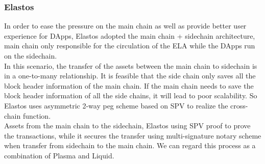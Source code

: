 \subsubsection{Elastos}
\noindent In order to ease the pressure on the main chain as well as provide better user experience for DApps, Elastos\cite{Elastos} adopted the main chain + sidechain architecture,  main chain only responsible for the circulation of the ELA while the DApps run on the sidechain. \\
\noindent In this scenario, the transfer of the assets between the main chain to sidechain is in a one-to-many relationship. It is feasible that the side chain only saves all the block header information of the main chain. If the main chain needs to save the block header information of all the side chains, it will lead to poor scalability. So Elastos uses asymmetric 2-way peg scheme based on SPV to realize the cross-chain function.\\
\noindent Assets from the main chain to the sidechain, Elastos using SPV proof to prove the transactions, while it secures the transfer using multi-signature notary scheme when transfer from sidechain to the main chain. We can regard this process as a combination of Plasma and Liquid.

